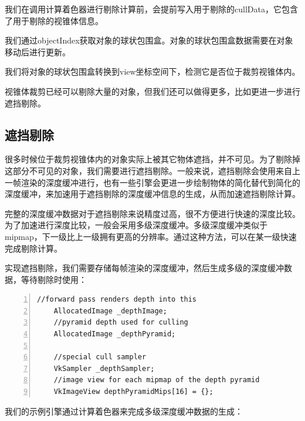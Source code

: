 \documentclass{ctexart}
\begin{document}
我们在调用计算着色器进行剔除计算前，会提前写入用于剔除的cullData，它包含了用于剔除的视锥体信息。

我们通过objectIndex获取对象的球状包围盒。对象的球状包围盒数据需要在对象移动后进行更新。

我们将对象的球状包围盒转换到view坐标空间下，检测它是否位于裁剪视锥体内。

视锥体裁剪已经可以剔除大量的对象，但我们还可以做得更多，比如更进一步进行遮挡剔除。

\subsection{遮挡剔除}

很多时候位于裁剪视锥体内的对象实际上被其它物体遮挡，并不可见。为了剔除掉这部分不可见的对象，我们需要进行遮挡剔除。一般来说，遮挡剔除会使用来自上一帧渲染的深度缓冲进行，也有一些引擎会更进一步绘制物体的简化替代到简化的深度缓冲，来加速用于遮挡剔除的深度缓冲信息的生成，从而加速遮挡剔除计算。

完整的深度缓冲数据对于遮挡剔除来说精度过高，很不方便进行快速的深度比较。为了加速进行深度比较，一般会采用多级深度缓冲。多级深度缓冲类似于mipmap，下一级比上一级拥有更高的分辨率。通过这种方法，可以在某一级快速完成剔除计算。

实现遮挡剔除，我们需要存储每帧渲染的深度缓冲，然后生成多级的深度缓冲数据，等待剔除时使用：


\begin{lstlisting}[language={[ANSI]C},keywordstyle=\color{blue!70},commentstyle=\color{red!50!green!50!blue!50},frame=shadowbox, rulesepcolor=\color{red!20!green!20!blue!20},basicstyle=\small,numbers=left, numberstyle=\tiny,breaklines=true]
	//forward pass renders depth into this
	AllocatedImage _depthImage;
	//pyramid depth used for culling
	AllocatedImage _depthPyramid;
	
	//special cull sampler
	VkSampler _depthSampler;
	//image view for each mipmap of the depth pyramid
	VkImageView depthPyramidMips[16] = {};
\end{lstlisting}

我们的示例引擎通过计算着色器来完成多级深度缓冲数据的生成：
\end{document}
